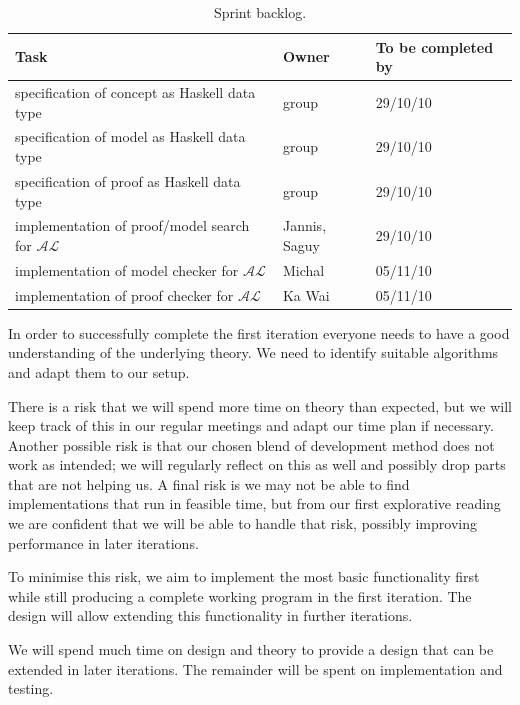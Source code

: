 
\begin{table}
  \caption{Sprint backlog.}
  \begin{tabular}{l|l|l}
    \hline
    \textbf{Task} & \textbf{Owner} & \textbf{To be completed by} \\
    \hline
    specification of concept as Haskell data type & group & 29/10/10 \\
    specification of model as Haskell data type & group & 29/10/10 \\
    specification of proof as Haskell data type & group & 29/10/10 \\
    implementation of proof/model search for $\mathcal{AL}$ & Jannis, Saguy & 29/10/10 \\
    implementation of model checker for $\mathcal{AL}$ & Michal & 05/11/10 \\
    implementation of proof checker for $\mathcal{AL}$ & Ka Wai & 05/11/10
  \end{tabular}
  \label{sprint}
\end{table}


In order to successfully complete the first iteration everyone needs to have a good
understanding of the underlying theory. We need to identify suitable algorithms and
adapt them to our setup. 

There is a risk that we will spend more time on theory than expected, but we will keep
track of this in our regular meetings and adapt our time plan if necessary.
Another possible risk is that our chosen blend
of development method does not work as intended; we will regularly reflect on this as well
and possibly drop parts that are not helping us. A final risk is we may not be able
to find implementations that run in feasible time, but from our first explorative reading
we are confident that we will be able to handle that risk, possibly improving performance
in later iterations.


To minimise this risk, we aim to implement the most basic functionality first while
still producing a complete working program in the first iteration. The design will
allow extending this functionality in further iterations.

We will spend much time on design and theory to provide a design that can be extended
in later iterations. The remainder will be spent on implementation and testing.

